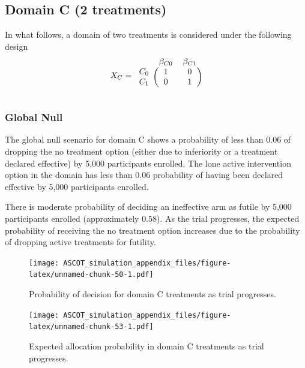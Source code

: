 \documentclass[
]{article}
\begin{document}
\clearpage

\hypertarget{domain-c-2-treatments}{%
\subsection{Domain C (2 treatments)}\label{domain-c-2-treatments}}

In what follows, a domain of two treatments is considered under the following design
\[
 X_{C} = 
\begin{blockarray}{ccc}
          & \beta_{C0} & \beta_{C1} \\
\begin{block}{r(cc)}
      C_0 & 1 & 0 \\
      C_1 & 0 & 1 \\
\end{block}
\end{blockarray}
\]

\hypertarget{global-null}{%
\subsubsection{Global Null}\label{global-null}}

The global null scenario for domain C shows a probability of less than 0.06 of dropping the no treatment option (either due to inferiority or a treatment declared effective) by 5,000 participants enrolled.
The lone active intervention option in the domain has less than 0.06 probability of having been declared effective by 5,000 participants enrolled.

There is moderate probability of deciding an ineffective arm as futile by 5,000 participants enrolled (approximately \(0.58\)).
As the trial progresses, the expected probability of receiving the no treatment option increases due to the probability of dropping active treatments for futility.

\begin{figure}
\centering
\texttt{[image: ASCOT\_simulation\_appendix\_files/figure-latex/unnamed-chunk-50-1.pdf]}
\caption{\label{fig:unnamed-chunk-50}Probability of decision for domain C treatments as trial progresses.}
\end{figure}

\begin{figure}
\centering
\texttt{[image: ASCOT\_simulation\_appendix\_files/figure-latex/unnamed-chunk-53-1.pdf]}
\caption{\label{fig:unnamed-chunk-53}Expected allocation probability in domain C treatments as trial progresses.}
\end{figure}
\end{document}
